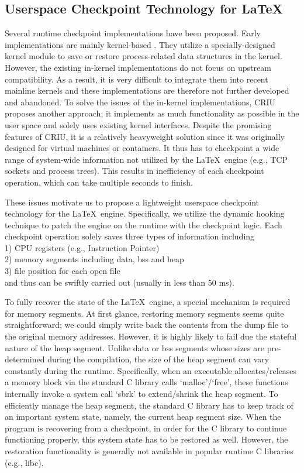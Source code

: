 \documentclass[]{sigchi}
\begin{document}
\subsection{Userspace Checkpoint Technology for \LaTeX}
Several runtime checkpoint implementations have been proposed. Early implementations are mainly kernel-based \cite{hargrove2006berkeley}. They utilize a specially-designed kernel module to save or restore process-related data structures in the kernel. However, the existing in-kernel implementations do not focus on upstream compatibility. As a result, it is very difficult to integrate them into recent mainline kernels and these implementations are therefore not further developed and abandoned.
To solve the issues of the in-kernel implementations, CRIU \cite{emelyanovcriu} proposes another approach; it implements as much functionality as possible in the user space and solely uses existing kernel interfaces. Despite the promising features of CRIU, it is a relatively heavyweight solution since it was originally designed for virtual machines or containers. It thus has to checkpoint a wide range of system-wide information not utilized by the \LaTeX\ engine (e.g., TCP sockets and process trees). This results in inefficiency of each checkpoint operation, which can take multiple seconds to finish.


These issues motivate us to propose a lightweight userspace checkpoint technology for the \LaTeX\ engine. Specifically, we utilize the dynamic hooking technique \cite{hooking} to patch the engine on the runtime with the checkpoint logic. Each checkpoint operation solely saves three types of information including \\	
1) CPU registers (e.g., Instruction Pointer) \\
2) memory segments including data, bss and heap \\
3) file position for each open file \\
and thus can be swiftly carried out (usually in less than 50 ms).

To fully recover the state of the \LaTeX\ engine, a special mechanism is required for memory segments. At first glance, restoring memory segments seems quite straightforward; we could simply write back the contents from the dump file to the original memory addresses. However, it is highly likely to fail due the stateful nature of the heap segment. Unlike data or bss segments whose sizes are pre-determined during the compilation, the size of the heap segment can vary constantly during the runtime. Specifically, when an executable allocates/releases a memory block via the standard C library calls `malloc'/`free', these functions internally invoke a system call `sbrk' to extend/shrink the heap segment. To efficiently manage the heap segment, the standard C library has to keep track of an important system state, namely, the current heap segment size. When the program is recovering from a checkpoint, in order for the C library to continue functioning properly, this system state has to be restored as well. However, the restoration functionality is generally not available in popular runtime C libraries (e.g., libc). 
\end{document}
